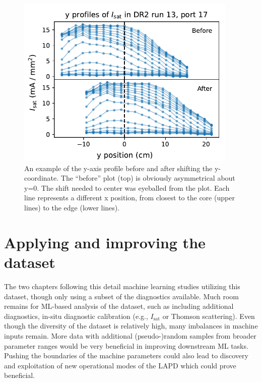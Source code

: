 \begin{figure}
	\centering
	\includegraphics[width=300pt]{figures/y-alignment_before-after.pdf}
	\caption[y-axis profile before and after shifting the y-coordinate]{\label{fig:y-alignment_before-after}An example of the y-axis profile before and after shifting the y-coordinate. The ``before'' plot (top) is obviously asymmetrical about y=0. The shift needed to center was eyeballed from the plot. Each line represents a different x position, from closest to the core (upper lines) to the edge (lower lines).}
\end{figure}

\section{Applying and improving the dataset}

The two chapters following this detail machine learning studies utilizing this dataset, though only using a subset of the diagnostics available. Much room remains for ML-based analysis of the dataset, such as including additional diagnostics, in-situ diagnostic calibration (e.g., $I_\text{sat}$ or Thomson scattering). Even though the diversity of the dataset is relatively high, many imbalances in machine inputs remain. More data with additional (pseudo-)random samples from broader parameter ranges would be very beneficial in improving downstream ML tasks. Pushing the boundaries of the machine parameters could also lead to discovery and exploitation of new operational modes of the LAPD which could prove beneficial.

